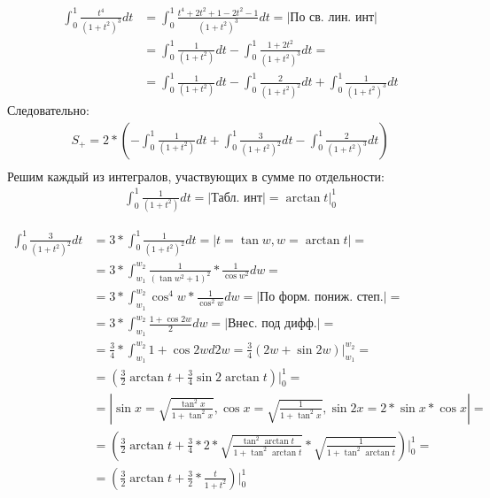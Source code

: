 \documentclass[12pt, a4paper]{article}
\begin{document}
\begin{equation*}
\begin{aligned}
\int_{0}^{1} \frac{t^4}{\left(1+t^2\right)^3} dt &= \int_{0}^{1} \frac{t^4 + 2t^2 + 1 -2t^2 - 1}{\left(1+t^2\right)^3} dt = |\text{По св. лин. инт}|\\
&= \int_{0}^{1} \frac{1}{\left(1+t^2\right)} dt - \int_{0}^{1} \frac{1+2t^2}{\left(1+t^2\right)^3} dt =\\
&= \int_{0}^{1} \frac{1}{\left(1+t^2\right)} dt - \int_{0}^{1} \frac{2}{\left(1+t^2\right)^2} dt + \int_{0}^{1} \frac{1}{\left(1+t^2\right)^3} dt
\end{aligned}
\end{equation*}
Следовательно:
\begin{equation*}
\begin{aligned}
S_{+} = 2*\left( -\int_{0}^{1} \frac{1}{\left(1+t^2\right)} dt + \int_{0}^{1} \frac{3}{\left(1+t^2\right)^2} dt - \int_{0}^{1} \frac{2}{\left(1+t^2\right)^3} dt\right)\\
\end{aligned}
\end{equation*}
Решим каждый из интегралов, участвующих в сумме по отдельности:
\begin{equation*}
\begin{aligned}
\int_{0}^{1} \frac{1}{\left(1+t^2\right)} dt = |\text{Табл. инт}| = \arctan{t}|_0^1
\end{aligned}
\end{equation*}

\begin{equation*}
\begin{aligned}
\int_{0}^{1} \frac{3}{\left(1+t^2\right)^2} dt &=3 * \int_{0}^{1} \frac{1}{\left(1+t^2\right)^2} dt = |t = \tan{w}, w = \arctan{t}| =\\
&=3 * \int_{w_1}^{w_2} \frac{1}{\left(\tan{w}^2+1\right)^2} * \frac{1}{\cos{w}^2} dw = \\
&= 3 * \int_{w_1}^{w_2} \cos^4{w} * \frac{1}{\cos^2{w}} dw = |\text{По форм. пониж. степ.}| =\\
&= 3 * \int_{w_1}^{w_2} \frac{1+\cos{2w}}{2} dw = |\text{Внес. под дифф.}| =\\
&= \frac{3}{4} * \int_{w_1}^{w_2} 1+\cos{2w} d2w = \frac{3}{4}(2w +\sin{2w})|_{w_1}^{w_2} =\\
&= \left(\frac{3}{2}\arctan{t} + \frac{3}{4}\sin{2\arctan{t}}\right)|_0^1 =\\
&= |\sin{x}=\sqrt{\frac{\tan^2{x}}{1+\tan^2{x}}},\cos{x}=\sqrt{\frac{1}{1+\tan^2{x}}}, \sin{2x}=2*\sin{x}*\cos{x}| =\\
&= \left(\frac{3}{2}\arctan{t} + \frac{3}{4} * 2 *\sqrt{\frac{\tan^2{\arctan{t}}}{1+\tan^2{\arctan{t}}}}*\sqrt{\frac{1}{1+\tan^2{\arctan{t}}}}\right)|_0^1 =\\
&=\left(\frac{3}{2}\arctan{t} + \frac{3}{2}*\frac{t}{1+t^2}\right)|_0^1
\end{aligned}
\end{equation*}
\end{document}
